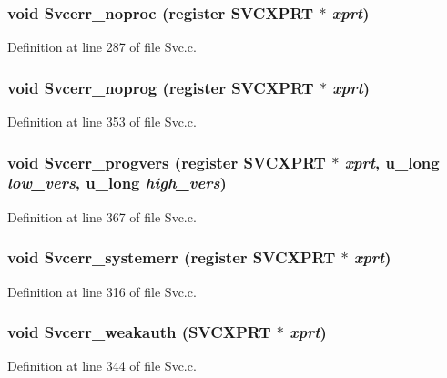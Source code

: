 \subsubsection{\setlength{\rightskip}{0pt plus 5cm}void Svcerr\_\-noproc (register SVCXPRT $\ast$ {\em xprt})}\label{Svc_8c_a15}




Definition at line 287 of file Svc.c.
\subsubsection{\setlength{\rightskip}{0pt plus 5cm}void Svcerr\_\-noprog (register SVCXPRT $\ast$ {\em xprt})}\label{Svc_8c_a20}




Definition at line 353 of file Svc.c.
\subsubsection{\setlength{\rightskip}{0pt plus 5cm}void Svcerr\_\-progvers (register SVCXPRT $\ast$ {\em xprt}, u\_\-long {\em low\_\-vers}, u\_\-long {\em high\_\-vers})}\label{Svc_8c_a21}




Definition at line 367 of file Svc.c.
\subsubsection{\setlength{\rightskip}{0pt plus 5cm}void Svcerr\_\-systemerr (register SVCXPRT $\ast$ {\em xprt})}\label{Svc_8c_a17}




Definition at line 316 of file Svc.c.
\subsubsection{\setlength{\rightskip}{0pt plus 5cm}void Svcerr\_\-weakauth (SVCXPRT $\ast$ {\em xprt})}\label{Svc_8c_a19}




Definition at line 344 of file Svc.c.

